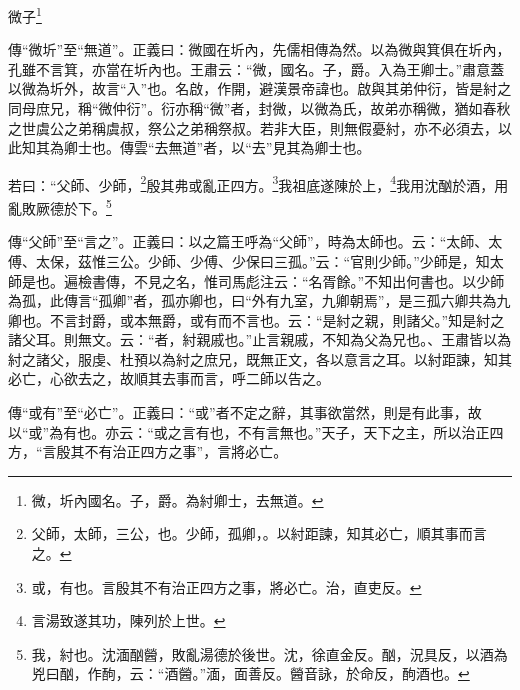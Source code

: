 微子\footnote{微，圻內國名。子，爵。為紂卿士，去無道。}

{\noindent\zhuan{}\fzbyks 傳“微圻”至“無道”。正義曰：微國在圻內，先儒相傳為然。以為微與箕俱在圻內，孔雖不言箕，亦當在圻內也。王肅云：“微，國名。子，爵。入為王卿士。”肅意蓋以微為圻外，故言“入”也。名啟，作開，避漢景帝諱也。啟與其弟仲衍，皆是紂之同母庶兄，稱“微仲衍”。衍亦稱“微”者，封微，以微為氏，故弟亦稱微，猶如春秋之世虞公之弟稱虞叔，祭公之弟稱祭叔。若非大臣，則無假憂紂，亦不必須去，以此知其為卿士也。傳雲“去無道”者，以“去”見其為卿士也。 \par}

若曰：“父師、少師，\footnote{父師，太師，三公，也。少師，孤卿，。以紂距諫，知其必亡，順其事而言之。}殷其弗或亂正四方。\footnote{或，有也。言殷其不有治正四方之事，將必亡。治，直吏反。}我祖底遂陳於上，\footnote{言湯致遂其功，陳列於上世。}我用沈酗於酒，用亂敗厥德於下。\footnote{我，紂也。沈湎酗醟，敗亂湯德於後世。沈，徐直金反。酗，況具反，以酒為兇曰酗，作䣱，云：“酒醟。”湎，面善反。醟音詠，於命反，䣱酒也。}


{\noindent\zhuan{}\fzbyks 傳“父師”至“言之”。正義曰：以之篇王呼為“父師”，時為太師也。云：“太師、太傅、太保，茲惟三公。少師、少傅、少保曰三孤。”云：“官則少師。”少師是，知太師是也。遍檢書傳，不見之名，惟司馬彪注云：“名胥餘。”不知出何書也。以少師為孤，此傳言“孤卿”者，孤亦卿也，曰“外有九室，九卿朝焉”，是三孤六卿共為九卿也。不言封爵，或本無爵，或有而不言也。云：“是紂之親，則諸父。”知是紂之諸父耳。則無文。云：“者，紂親戚也。”止言親戚，不知為父為兄也。、王肅皆以為紂之諸父，服虔、杜預以為紂之庶兄，既無正文，各以意言之耳。以紂距諫，知其必亡，心欲去之，故順其去事而言，呼二師以告之。 \par}

{\noindent\zhuan{}\fzbyks 傳“或有”至“必亡”。正義曰：“或”者不定之辭，其事欲當然，則是有此事，故以“或”為有也。亦云：“或之言有也，不有言無也。”天子，天下之主，所以治正四方，“言殷其不有治正四方之事”，言將必亡。 \par}

